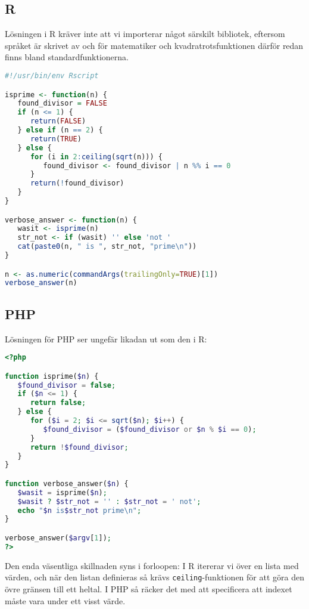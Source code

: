 \documentclass[10pt, twoside,a4paper]{article}
\begin{document}
\subsection{R}
Lösningen i R kräver inte att vi importerar något särskilt bibliotek, eftersom språket är skrivet av och för matematiker och kvadratrotsfunktionen därför redan finns bland standardfunktionerna.
\begin{lstlisting}[language=R]
#!/usr/bin/env Rscript

isprime <- function(n) {
   found_divisor = FALSE
   if (n <= 1) {
      return(FALSE)
   } else if (n == 2) {
      return(TRUE)
   } else {
      for (i in 2:ceiling(sqrt(n))) {
         found_divisor <- found_divisor | n %% i == 0
      }
      return(!found_divisor)
   }
}

verbose_answer <- function(n) {
   wasit <- isprime(n)
   str_not <- if (wasit) '' else 'not '
   cat(paste0(n, " is ", str_not, "prime\n"))
}

n <- as.numeric(commandArgs(trailingOnly=TRUE)[1])
verbose_answer(n)
\end{lstlisting}

\newpage
\subsection{PHP}
Lösningen för PHP ser ungefär likadan ut som den i R:
\begin{lstlisting}[language=PHP]
<?php

function isprime($n) {
   $found_divisor = false;
   if ($n <= 1) {
      return false;
   } else {
      for ($i = 2; $i <= sqrt($n); $i++) {
         $found_divisor = ($found_divisor or $n % $i == 0);
      }
      return !$found_divisor;
   }
}

function verbose_answer($n) {
   $wasit = isprime($n);
   $wasit ? $str_not = '' : $str_not = ' not';
   echo "$n is$str_not prime\n";
}

verbose_answer($argv[1]);
?>
\end{lstlisting}
Den enda väsentliga skillnaden syns i forloopen: I R itererar vi över en lista med värden, och när den listan definieras så krävs \verb+ceiling+-funktionen för att göra den övre gränsen till ett heltal. I PHP så räcker det med att specificera att indexet måste vara under ett visst värde.

\newpage
\end{document}

